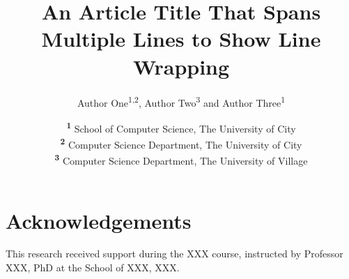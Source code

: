 \documentclass[twocolumn]{NobArticle}
\title{An Article Title That Spans Multiple Lines to Show Line Wrapping}
\author{
    Author One\textsuperscript{1,2}, 
    Author Two\textsuperscript{3} 
    and Author Three\textsuperscript{1}
}
\date{
    \textsuperscript{\textbf{1}}
    School of Computer Science, The University of City \\ \textsuperscript{\textbf{2}}
    Computer Science Department, The University of City \\ \textsuperscript{\textbf{3}}
    Computer Science Department, The University of Village
}
\begin{document}
\small
\maketitle








\section*{Acknowledgements}
This research received support during the XXX course, instructed by Professor XXX, PhD at the School of XXX, XXX.

\printbibliography
\end{document}
